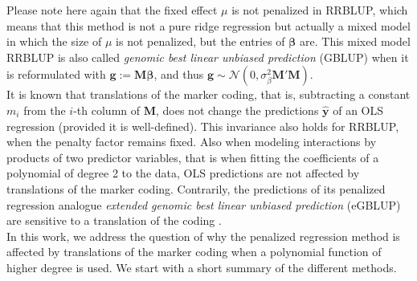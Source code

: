 \documentclass{bmcart}
\newcommand{\M}{\mathbf{M}}
\newcommand{\0}{\mathbf{0}}
\newcommand{\y}{\mathbf{y}}
\begin{document}
Please note here again that the fixed effect $\mu$ is not penalized in RRBLUP, which means that this method is not a pure ridge regression but actually a mixed model in which the size of $\mu$ is not penalized, but the entries of $\bm{\beta}$ are.  
This mixed model RRBLUP is also called \emph{genomic best linear unbiased prediction} (GBLUP) when it is reformulated with $\mathbf{g}:=\M \bm{\beta}$, and thus $\mathbf{g}\sim \mathcal{N}(0,\sigma_\beta^2 \M' \M)$. \\

It is known that translations of the marker coding, that is, subtracting a constant $m_i$ from the $i$-th column of $\M$, does not change the predictions $\hat{\y}$ of an  OLS regression (provided it is well-defined). This invariance also holds for RRBLUP, when the penalty factor remains fixed. Also when modeling interactions by products of two predictor variables, that is when fitting the coefficients of a polynomial of degree 2 to the data, OLS predictions are not affected by translations of the marker coding. Contrarily, the predictions of its penalized regression analogue \emph{extended genomic best linear unbiased prediction} (eGBLUP) are sensitive to a translation of the coding \cite{he2016does,Martini17}.\\

In this work, we address the question of why the penalized regression method is affected by translations of the marker coding when a polynomial function of higher degree is used. 
We  start with a short summary of the different methods.
\end{document}
